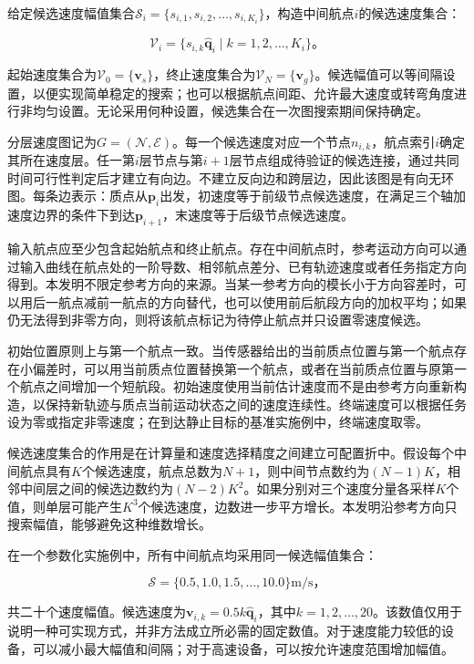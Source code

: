 \documentclass[UTF8,a4paper,12pt,fontset=fandol]{ctexart}
\begin{document}
给定候选速度幅值集合\(\mathcal S_i=\{s_{i,1},s_{i,2},\ldots,s_{i,K_i}\}\)，构造中间航点\(i\)的候选速度集合：

\[
\mathcal V_i=\{s_{i,k}\widehat{\mathbf q}_i\mid k=1,2,\ldots,K_i\}\text{。}
\]

起始速度集合为\(\mathcal V_0=\{\mathbf v_s\}\)，终止速度集合为\(\mathcal V_N=\{\mathbf v_g\}\)。候选幅值可以等间隔设置，以便实现简单稳定的搜索；也可以根据航点间距、允许最大速度或转弯角度进行非均匀设置。无论采用何种设置，候选集合在一次图搜索期间保持确定。

分层速度图记为\(G=(\mathcal N,\mathcal E)\)。每一个候选速度对应一个节点\(n_{i,k}\)，航点索引\(i\)确定其所在速度层。任一第\(i\)层节点与第\(i+1\)层节点组成待验证的候选连接，通过共同时间可行性判定后才建立有向边。不建立反向边和跨层边，因此该图是有向无环图。每条边表示：质点从\(\mathbf p_i\)出发，初速度等于前级节点候选速度，在满足三个轴加速度边界的条件下到达\(\mathbf p_{i+1}\)，末速度等于后级节点候选速度。

输入航点应至少包含起始航点和终止航点。存在中间航点时，参考运动方向可以通过输入曲线在航点处的一阶导数、相邻航点差分、已有轨迹速度或者任务指定方向得到。本发明不限定参考方向的来源。当某一参考方向的模长小于方向容差时，可以用后一航点减前一航点的方向替代，也可以使用前后航段方向的加权平均；如果仍无法得到非零方向，则将该航点标记为待停止航点并只设置零速度候选。

初始位置原则上与第一个航点一致。当传感器给出的当前质点位置与第一个航点存在小偏差时，可以用当前质点位置替换第一个航点，或者在当前质点位置与原第一个航点之间增加一个短航段。初始速度使用当前估计速度而不是由参考方向重新构造，以保持新轨迹与质点当前运动状态之间的速度连续性。终端速度可以根据任务设为零或指定非零速度；在到达静止目标的基准实施例中，终端速度取零。

候选速度集合的作用是在计算量和速度选择精度之间建立可配置折中。假设每个中间航点具有\(K\)个候选速度，航点总数为\(N+1\)，则中间节点数约为\((N-1)K\)，相邻中间层之间的候选边数约为\((N-2)K^2\)。如果分别对三个速度分量各采样\(K\)个值，则单层可能产生\(K^3\)个候选速度，边数进一步平方增长。本发明沿参考方向只搜索幅值，能够避免这种维数增长。

在一个参数化实施例中，所有中间航点均采用同一候选幅值集合：

\[
\mathcal S=\{0.5,1.0,1.5,\ldots,10.0\}\text{m/s}\text{，}
\]

共二十个速度幅值。候选速度为\(\mathbf v_{i,k}=0.5k\widehat{\mathbf q}_i\)，其中\(k=1,2,\ldots,20\)。该数值仅用于说明一种可实现方式，并非方法成立所必需的固定数值。对于速度能力较低的设备，可以减小最大幅值和间隔；对于高速设备，可以按允许速度范围增加幅值。
\end{document}
